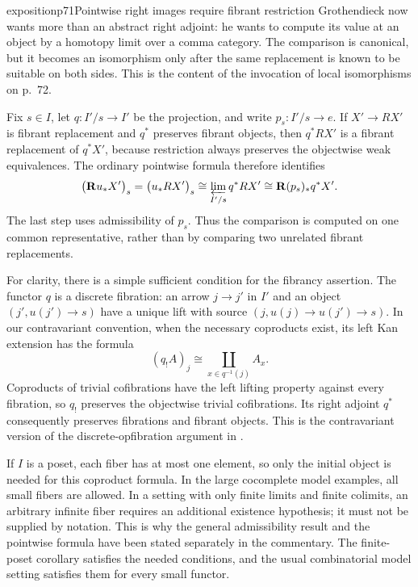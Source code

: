 

\begin{dcomment}{exposition}{p71}{Pointwise right images require fibrant restriction}
Grothendieck now wants more than an abstract right adjoint: he wants to compute its value at an object by a homotopy limit over a comma category. The comparison is canonical, but it becomes an isomorphism only after the same replacement is known to be suitable on both sides. This is the content of the invocation of local isomorphisms on p.~72.

Fix $s\in I$, let $q:I'/s\to I'$ be the projection, and write $p_s:I'/s\to e$. If $X'\to RX'$ is fibrant replacement and $q^*$ preserves fibrant objects, then $q^*RX'$ is a fibrant replacement of $q^*X'$, because restriction always preserves the objectwise weak equivalences. The ordinary pointwise formula therefore identifies
\[
 \bigl(\mathbf Ru_*X'\bigr)_s
   =\bigl(u_*RX'\bigr)_s
   \cong\varprojlim_{I'/s}q^*RX'
   \cong\mathbf R(p_s)_*q^*X'.
\]
The last step uses admissibility of $p_s$. Thus the comparison is computed on one common representative, rather than by comparing two unrelated fibrant replacements.

For clarity, there is a simple sufficient condition for the fibrancy assertion. The functor $q$ is a discrete fibration: an arrow $j\to j'$ in $I'$ and an object $(j',u(j')\to s)$ have a unique lift with source $(j,u(j)\to u(j')\to s)$. In our contravariant convention, when the necessary coproducts exist, its left Kan extension has the formula
\[
                           (q_!A)_j\cong\coprod_{x\in q^{-1}(j)}A_x.
\]
Coproducts of trivial cofibrations have the left lifting property against every fibration, so $q_!$ preserves the objectwise trivial cofibrations. Its right adjoint $q^*$ consequently preserves fibrations and fibrant objects. This is the contravariant version of the discrete-opfibration argument in \citet[Lemma 1.31]{Groth2013}.

If $I$ is a poset, each fiber has at most one element, so only the initial object is needed for this coproduct formula. In the large cocomplete model examples, all small fibers are allowed. In a setting with only finite limits and finite colimits, an arbitrary infinite fiber requires an additional existence hypothesis; it must not be supplied by notation. This is why the general admissibility result and the pointwise formula have been stated separately in the commentary. The finite-poset corollary satisfies the needed conditions, and the usual combinatorial model setting satisfies them for every small functor.


\end{dcomment}
